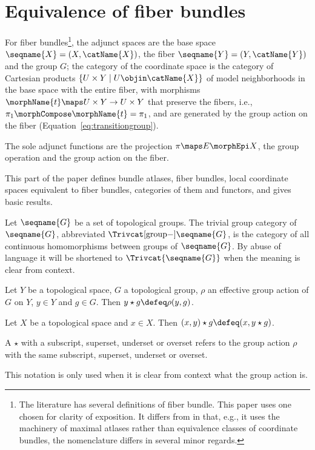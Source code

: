 \documentclass{article}
\begin{document}
\part{Equivalence of fiber bundles}
\label{part:bun}
For fiber bundles\footnote{
  The literature has several definitions of fiber bundle. This paper
  uses one chosen for clarity of exposition. It differs from
  \cite[p.~8]{TopFib} in that, e.g., it uses the machinery of maximal
  atlases rather than equivalence classes of coordinate bundles, the
  nomenclature differs in several minor regards.
},
the adjunct spaces are the base space $\seqname{X} = (X,\catName{X})$,
the fiber $\seqname{Y} = (Y, \catName{Y})$
and the group $G$;
the category of the coordinate space is the category of Cartesian
products $\{U \times Y \mid U \objin \catName{X}\}$ of model
neighborhoods in the base space with the entire fiber, with morphisms
$\morphName{t} \maps U \times Y \to U \times Y$ that preserve the
fibers, i.e., $\pi_1 \morphCompose \morphName{t} = \pi_1$, and are
generated by the group action on the fiber
(Equation~\eqref{eq:transitiongroup}).

The sole adjunct functions are the projection $\pi \maps E \morphEpi X$, the
group operation and the group action on the fiber.

This part of the paper defines bundle atlases, fiber bundles, local
coordinate spaces equivalent to fiber bundles, categories of them and
functors, and gives basic results.

\begin{definition}
Let $\seqname{G}$ be a set of topological groups. The trivial group
category of $\seqname{G}$, abbreviated
$\Trivcat[\mathrm{group}-]{\seqname{G}}$, is the category of all
continuous homomorphisms between groups of $\seqname{G}$. By abuse of
language it will be shortened to $\Trivcat{\seqname{G}}$ when the
meaning is clear from context.
\end{definition}

\begin{definition}
Let $Y$ be a topological space, $G$ a topological group, $\rho$ an
effective group action of $G$ on $Y$, $y \in Y$ and $g \in G$. Then
$y \star g \defeq \rho(y,g)$.

Let $X$ be a topological space and $x \in X$. Then
$(x, y) \star g \defeq (x, y \star g)$.

A $\star$ with a subscript, superset, underset or overset refers to the
group action $\rho$ with the same subscript, superset, underset or
overset.

\begin{remark}
This notation is only used when it is clear from context what the group
action is.
\end{remark}
\end{definition}
\end{document}
